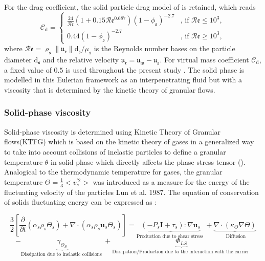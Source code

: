 \documentclass[11pt]{report}
\begin{document}
%
For the drag coefficient, the solid particle drag model of \citet{wen1966generalized} is retained, which reads
\begin{equation}
\mathcal{C}_{\mathrm{d}}=
\begin{cases}
\frac{24}{\mathcal{R}\mathfrak{e}}\left(1+0.15\mathcal{R}\mathfrak{e}^{0.687}\right)\left(1-\phi_{\mathfrak{s}}\right)^{-2.7}&\text{, if } \mathcal{R}\mathfrak{e}\le 10^3,\\
0.44\left(1-\phi_{\mathfrak{s}}\right)^{-2.7} &\text{, if } \mathcal{R}\mathfrak{e}\ge 10^3,
\end{cases}
\end{equation}
where $\mathcal{R}\mathfrak{e}=\varrho_{\mathfrak{s}}\|\mathfrak{u}_{\mathfrak{r}}\|\mathrm{d}_{\mathfrak{s}}/\mu_{\mathfrak{s}}$ is the Reynolds number bases on the particle diameter $\mathrm{d}_{\mathfrak{s}}$ and the relative velocity $\boldsymbol{\mathfrak{u}}_{\mathfrak{r}}=\boldsymbol{\mathfrak{u}}_{\mathfrak{w}}-\boldsymbol{\mathfrak{u}}_{\mathfrak{s}}$. For virtual mass coefficient 
$\mathcal{C}_{\mathrm{d}}$, a fixed value of $0.5$ is used throughout the present study \cite{auton1988force}.
The solid phase is modelled in this Eulerian framework as an interpenetrating fluid but with a viscosity that is determined by the kinetic theory of granular flows.
%
\subsubsection{Solid-phase viscosity}
%
Solid-phase viscosity is determined using Kinetic Theory of Granular flows(KTFG) which is based on the kinetic theory of gases 
%
in a generalized way to take into account collisions of inelastic particles to define a granular temperature $\theta$ in solid phase which directly affects the phase stress tensor (\cite{Gonzalez-2017}). 
%
Analogical to the thermodynamic temperature for gases, the granular temperature $\Theta=\frac{1}{3}<v_{s}^{\prime 2}>$ was introduced as a measure for the energy of the fluctuating velocity of the particles  Lun et al. 1987.
%
The equation of conservation of solids fluctuating energy can be expressed as \cite{Wang-2013}: 

\begin{equation}
\frac{3}{2}\left[\frac{\partial}{\partial t}\left(\alpha_{s} \rho_{s} \Theta_{s}\right)+\nabla \cdot\left(\alpha_{s} \rho_{s} \mathbf{u}_{s} \Theta_{s}\right)\right]= 
\underbrace{\left(-P_{s} \mathbf{I}+\tau_{s}\right): \nabla \mathbf{u}_{s}}_{\text {Production due to shear stress }}+\underbrace{\nabla \cdot\left(\kappa_{\Theta} \nabla \Theta\right)}_{\text { Diffusion}}
\end{equation}
$$
-\underbrace{\gamma_{\Theta_S}}_{\text {Dissipation due  to  inelastic collisions }}+\underbrace{\Phi_{LS}}_{\text {Dissipation/Production  due to the interaction with the carrier }}
$$
\end{document}
